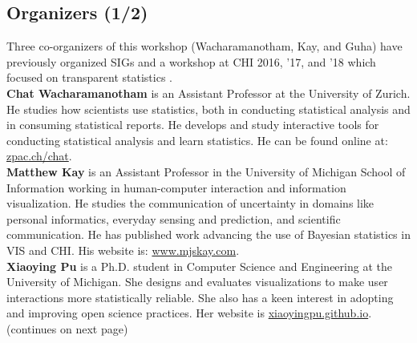 \documentclass[sigchi-a, authorversion]{acmart}
\begin{document}
\begin{sidebar}
\vspace{-5.5cm}
\section{Organizers (1/2)}

Three co-organizers of this workshop (Wacharamanotham, Kay, and Guha) have previously organized SIGs and a workshop at CHI 2016, '17, and '18 which focused on transparent statistics \cite{Kay2016a,Kay2017a,Wacharamanotham2018}. \\

\textbf{Chat Wacharamanotham} is an Assistant Professor at the University of Zurich. He studies how scientists use statistics, both in conducting statistical analysis and in consuming statistical reports. He develops and study interactive tools for conducting statistical analysis \cite{Wacharamanotham2015} and learn statistics. He can be found online at: \url{zpac.ch/chat}. \\

\textbf{Matthew Kay} is an Assistant Professor in the University of Michigan School of Information working in human-computer interaction and information visualization. He studies the communication of uncertainty in domains like personal informatics, everyday sensing and prediction, and scientific communication. He has published work advancing the use of Bayesian statistics in VIS and CHI. His website is: \url{www.mjskay.com}. \\

\textbf{Xiaoying Pu} is a Ph.D. student in Computer Science and Engineering at the University of Michigan. She designs and evaluates visualizations to make user interactions more statistically reliable. She also has a keen interest in adopting and improving open science practices. Her website is \url{xiaoyingpu.github.io}. \\

(continues on next page)
\end{sidebar}
\end{document}
